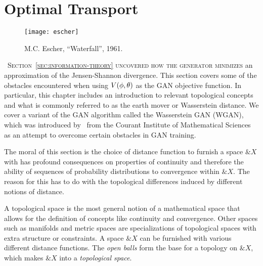 \section{Optimal Transport}%
\label{sec:optimal-transport}

\vspace{1cm}

\begin{figure}[h]%
  \label{fig:paradise} \centering
   {
    \texttt{[image: escher]}
  }
  \caption{M.C. Escher, ``Waterfall'', 1961.}
\end{figure}

\vspace{1cm}

\lettrine[lines=3]{\Royal~S}{ection~\ref{sec:information-theory}
  uncovered how the generator minimizes} an approximation of the
Jensen-Shannon divergence. This section covers some of the obstacles
encountered when using $V(\phi, \theta)$ as the GAN objective function. In
particular, this chapter includes an introduction to relevant
topological concepts and what is commonly referred to as the earth
mover or Wasserstein distance.  We cover a variant of the GAN
algorithm called the Wasserstein GAN (WGAN), which was introduced
by~\cite{ref:arjovsky-2017} from the Courant Institute of Mathematical
Sciences as an attempt to overcome certain obstacles in GAN training.

The moral of this section is the choice of distance function to
furnish a space $\&X$ with has profound consequences on properties of
continuity and therefore the ability of sequences of probability
distributions to convergence within $\&X$.  The reason for this has to
do with the topological differences induced by different notions of
distance.

A topological space is the most general notion of a mathematical space
that allows for the definition of concepts like continuity and
convergence.  Other spaces such as manifolds and metric spaces are
specializations of topological spaces with extra structure or
constraints.  A space $\&X$ can be furnished with various different
distance functions.  The \textit{open balls} form the base for a
topology on $\&X$, which makes $\&X$ into a \textit{topological
  space}.


